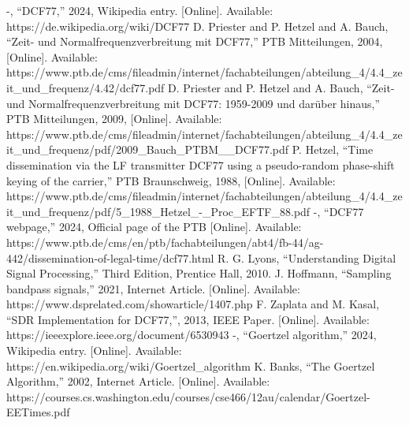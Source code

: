 \documentclass[conference]{IEEEtran}
\begin{document}
\begin{thebibliography}{00}
 -, ``DCF77,'' 2024, Wikipedia entry. [Online]. Available: https://de.wikipedia.org/wiki/DCF77
 D. Priester and P. Hetzel and A. Bauch, ``Zeit- und Normalfrequenzverbreitung mit DCF77,'' PTB Mitteilungen, 2004, [Online]. Available: https://www.ptb.de/cms/fileadmin/internet/fachabteilungen/abteilung\_4/4.4\_zeit\_und\_frequenz/4.42/dcf77.pdf
 D. Priester and P. Hetzel and A. Bauch, ``Zeit- und Normalfrequenzverbreitung mit DCF77: 1959-2009 und darüber hinaus,'' PTB Mitteilungen, 2009, [Online]. Available: https://www.ptb.de/cms/fileadmin/internet/fachabteilungen/abteilung\_4/4.4\_zeit\_und\_frequenz/pdf/2009\_Bauch\_PTBM\_\_DCF77.pdf
 P. Hetzel, ``Time dissemination via the LF transmitter DCF77 using a pseudo-random phase-shift keying of the carrier,'' PTB Braunschweig, 1988, [Online]. Available: https://www.ptb.de/cms/fileadmin/internet/fachabteilungen/abteilung\_4/4.4\_zeit\_und\_frequenz/pdf/5\_1988\_Hetzel\_-\_Proc\_EFTF\_88.pdf
 -, ``DCF77 webpage,'' 2024, Official page of the PTB [Online]. Available: https://www.ptb.de/cms/en/ptb/fachabteilungen/abt4/fb-44/ag-442/dissemination-of-legal-time/dcf77.html
 R. G. Lyons, ``Understanding Digital Signal Processing,'' Third Edition, Prentice Hall, 2010.
 J. Hoffmann, ``Sampling bandpass signals,'' 2021, Internet Article. [Online]. Available: https://www.dsprelated.com/showarticle/1407.php
 F. Zaplata and M. Kasal, ``SDR Implementation for DCF77,'', 2013, IEEE Paper. [Online]. Available: https://ieeexplore.ieee.org/document/6530943
 -, ``Goertzel algorithm,'' 2024, Wikipedia entry. [Online]. Available: https://en.wikipedia.org/wiki/Goertzel\_algorithm
 K. Banks, ``The Goertzel Algorithm,'' 2002, Internet Article. [Online]. Available: https://courses.cs.washington.edu/courses/cse466/12au/calendar/Goertzel-EETimes.pdf
\end{thebibliography}
\end{document}
